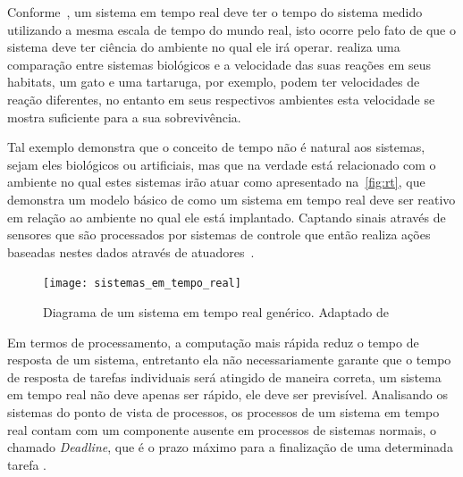 Conforme~, um sistema em tempo real deve ter o tempo do sistema medido utilizando a mesma escala de tempo do mundo real, isto ocorre pelo fato de que o sistema deve ter ciência do ambiente no qual ele irá operar. 
% 
 realiza uma comparação entre sistemas biológicos e a velocidade das suas reações em seus habitats, um gato e uma tartaruga, por exemplo, podem ter velocidades de reação diferentes, no entanto em seus respectivos ambientes esta velocidade se mostra suficiente para a sua sobrevivência. 

Tal exemplo demonstra que o conceito de tempo não é natural aos sistemas, sejam eles biológicos ou artificiais, mas que na verdade está relacionado com o ambiente no qual estes sistemas irão atuar como apresentado na~\autoref{fig:rt}, que demonstra um modelo básico de como um sistema em tempo real deve ser reativo em relação ao ambiente no qual ele está implantado. Captando sinais através de sensores que são processados por sistemas de controle que então realiza ações baseadas nestes dados através de atuadores~\cite{BUTTAZZO:2011}.

\begin{figure}[ht]
	\texttt{[image: sistemas\_em\_tempo\_real]}
    \centering
    \caption{Diagrama de um sistema em tempo real genérico. Adaptado de~}
    \label{fig:rt}
\end{figure}

Em termos de processamento, a computação mais rápida reduz o tempo de resposta de um sistema, entretanto ela não necessariamente garante que o tempo de resposta de tarefas individuais será atingido de maneira correta, um sistema em tempo real não deve apenas ser rápido, ele deve ser previsível. Analisando os sistemas do ponto de vista de processos, os processos de um sistema em tempo real contam com um componente ausente em processos de sistemas normais, o chamado \textit{Deadline}, que é o prazo máximo para a finalização de uma determinada tarefa \cite{BUTTAZZO:2011}.

